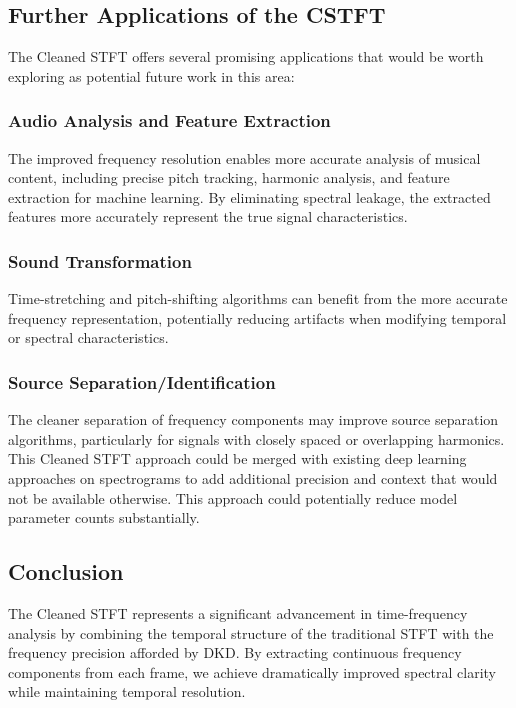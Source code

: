 \documentclass[11pt,twoside]{report}
\numberwithin{thm}{section}
\numberwithin{equation}{section}
\begin{document}
\subsection{Further Applications of the CSTFT}

The Cleaned STFT offers several promising applications that would be worth exploring as potential future work in this area:

\subsubsection{Audio Analysis and Feature Extraction}
The improved frequency resolution enables more accurate analysis of musical content, including precise pitch tracking, harmonic analysis, and feature extraction for machine learning. By eliminating spectral leakage, the extracted features more accurately represent the true signal characteristics.

\subsubsection{Sound Transformation}
Time-stretching and pitch-shifting algorithms can benefit from the more accurate frequency representation, potentially reducing artifacts when modifying temporal or spectral characteristics.

\subsubsection{Source Separation/Identification}
The cleaner separation of frequency components may improve source separation algorithms, particularly for signals with closely spaced or overlapping harmonics. This Cleaned STFT approach could be merged with existing deep learning approaches on spectrograms to add additional precision and context that would not be available otherwise. This approach could potentially reduce model parameter counts substantially.

\subsection{Conclusion}

The Cleaned STFT represents a significant advancement in time-frequency analysis by combining the temporal structure of the traditional STFT with the frequency precision afforded by DKD. By extracting continuous frequency components from each frame, we achieve dramatically improved spectral clarity while maintaining temporal resolution.
\end{document}
